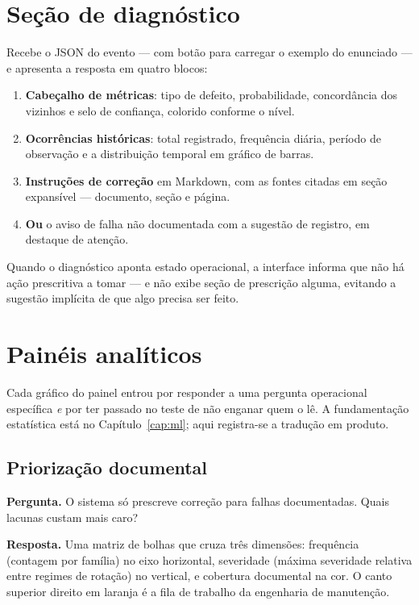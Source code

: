 \section{Seção de diagnóstico}

Recebe o JSON do evento --- com botão para carregar o exemplo do enunciado --- e
apresenta a resposta em quatro blocos:

\begin{enumerate}
  \item \textbf{Cabeçalho de métricas}: tipo de defeito, probabilidade,
    concordância dos vizinhos e selo de confiança, colorido conforme o nível.
  \item \textbf{Ocorrências históricas}: total registrado, frequência diária,
    período de observação e a distribuição temporal em gráfico de barras.
  \item \textbf{Instruções de correção} em Markdown, com as fontes citadas em
    seção expansível --- documento, seção e página.
  \item \textbf{Ou} o aviso de falha não documentada com a sugestão de registro,
    em destaque de atenção.
\end{enumerate}

Quando o diagnóstico aponta estado operacional, a interface informa que não há
ação prescritiva a tomar --- e não exibe seção de prescrição alguma, evitando a
sugestão implícita de que algo precisa ser feito.

\section{Painéis analíticos}
\label{sec:paineis}

Cada gráfico do painel entrou por responder a uma pergunta operacional
específica \emph{e} por ter passado no teste de não enganar quem o lê. A
fundamentação estatística está no Capítulo~\ref{cap:ml}; aqui registra-se a
tradução em produto.

\subsection{Priorização documental}
\label{sec:priorizacao}

\textbf{Pergunta.} O sistema só prescreve correção para falhas documentadas.
Quais lacunas custam mais caro?

\textbf{Resposta.} Uma matriz de bolhas que cruza três dimensões: frequência
(contagem por família) no eixo horizontal, severidade (máxima severidade
relativa entre regimes de rotação) no vertical, e cobertura documental na cor.
O canto superior direito em laranja é a fila de trabalho da engenharia de
manutenção.

